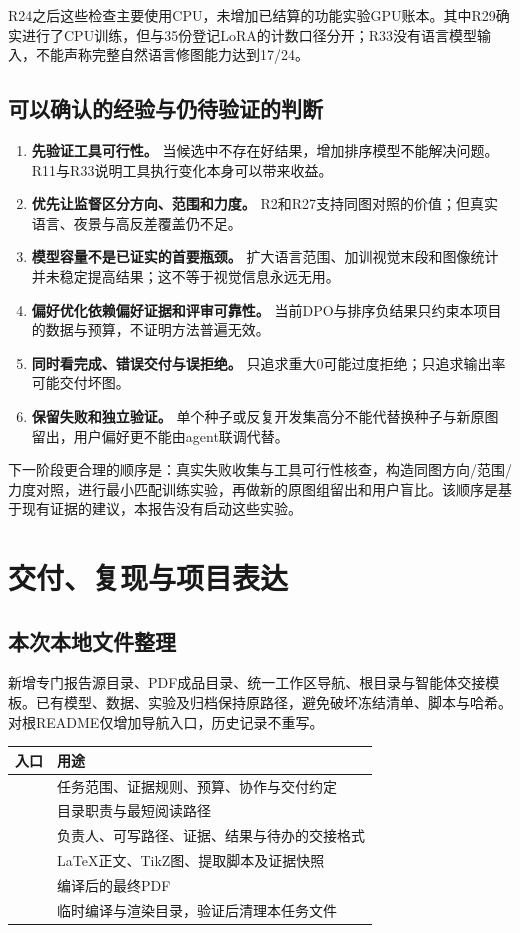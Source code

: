\documentclass[UTF8,fontset=none,zihao=5,a4paper]{ctexart}
\begin{document}
R24之后这些检查主要使用CPU，未增加已结算的功能实验GPU账本。其中R29确实进行了CPU训练，但与35份登记LoRA的计数口径分开；R33没有语言模型输入，不能声称完整自然语言修图能力达到17/24。

\subsection{可以确认的经验与仍待验证的判断}
\begin{enumerate}
\item \textbf{先验证工具可行性。} 当候选中不存在好结果，增加排序模型不能解决问题。R11与R33说明工具执行变化本身可以带来收益。
\item \textbf{优先让监督区分方向、范围和力度。} R2和R27支持同图对照的价值；但真实语言、夜景与高反差覆盖仍不足。
\item \textbf{模型容量不是已证实的首要瓶颈。} 扩大语言范围、加训视觉末段和图像统计并未稳定提高结果；这不等于视觉信息永远无用。
\item \textbf{偏好优化依赖偏好证据和评审可靠性。} 当前DPO与排序负结果只约束本项目的数据与预算，不证明方法普遍无效。
\item \textbf{同时看完成、错误交付与误拒绝。} 只追求重大0可能过度拒绝；只追求输出率可能交付坏图。
\item \textbf{保留失败和独立验证。} 单个种子或反复开发集高分不能代替换种子与新原图留出，用户偏好更不能由agent联调代替。
\end{enumerate}

下一阶段更合理的顺序是：真实失败收集与工具可行性核查，构造同图方向/范围/力度对照，进行最小匹配训练实验，再做新的原图组留出和用户盲比。该顺序是基于现有证据的建议，本报告没有启动这些实验。
\clearpage

\section{交付、复现与项目表达}
\subsection{本次本地文件整理}
新增专门报告源目录、PDF成品目录、统一工作区导航、根目录与智能体交接模板。已有模型、数据、实验及归档保持原路径，避免破坏冻结清单、脚本与哈希。对根README仅增加导航入口，历史记录不重写。

\noindent\begin{tabularx}{\linewidth}{@{}P{6.2cm}Y@{}}
\toprule
入口 & 用途\\
\midrule
{} & 任务范围、证据规则、预算、协作与交付约定\\
 & 目录职责与最短阅读路径\\
 & 负责人、可写路径、证据、结果与待办的交接格式\\
 & LaTeX正文、TikZ图、提取脚本及证据快照\\
 & 编译后的最终PDF\\
 & 临时编译与渲染目录，验证后清理本任务文件\\
\bottomrule
\end{tabularx}
\end{document}
